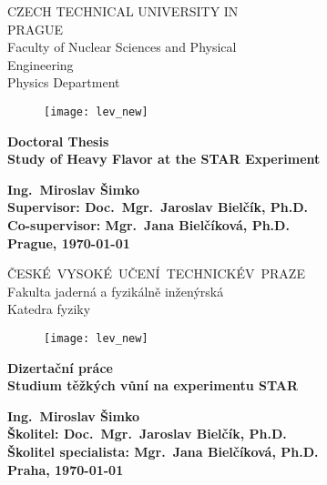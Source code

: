 \documentclass[a4paper,titlepage,11pt,twoside,openright]{report} %
\newcommand{\myself}{Ing.\ Miroslav Šimko}
\newcommand{\engtitle}{Study of Heavy Flavor at the STAR Experiment}
\newcommand{\czechtitle}{Studium těžkých vůní na experimentu STAR}
\newcommand{\skolitel}{Doc.\ Mgr.\ Jaroslav Bielčík, Ph.D.}
\newcommand{\konzultant}{Mgr.\ Jana Bielčíková, Ph.D.}
\begin{document}
\thispagestyle{empty}
\setcounter{page}{1}
\begin{center}
    {\LARGE \textsc CZECH TECHNICAL UNIVERSITY IN \\[0.3cm]PRAGUE}\\[2ex]
    {\LARGE \textsc Faculty of Nuclear Sciences and Physical \\[0.2cm]Engineering}\\[2ex]
    {\LARGE \textsc Physics Department}\\
    \vspace{1cm}
    \begin{figure}[ht!]
    \begin{center}
      {\texttt{[image: lev\_new]}}
    \end{center}
    \end{figure}
    \vspace{1cm}

    {\textbf {\Huge Doctoral Thesis \\[4ex]}
    {\LARGE \bf \engtitle} 
    }

    \vfill

    {\Large \bf \myself }\\ [4ex]
    {\large \bf  Supervisor: \skolitel}\\
    {\large \bf  Co-supervisor: \konzultant}\\[4ex]
    {\Large \bf Prague, \justyear\today}\\
    \newpage \rule{0pt}{2cm}
\end{center}
\thispagestyle{empty}
\begin{center}
    {\LARGE \textsc \mbox{\v{C}ESK\' E VYSOKÉ U\v CEN\' I TECHNICK\' E \\[0.3cm]V PRAZE}}\\[2ex]
    {\LARGE \textsc Fakulta jadern\' a a fyzik\' aln\v e in\v zen\' yrsk\' a}\\[2ex]
    {\LARGE \textsc Katedra fyziky}\\
    \vspace{1cm}
    \begin{figure}[ht!]
    \begin{center}
      {\texttt{[image: lev\_new]}}
    \end{center}
    \end{figure}
    \vspace{1cm}

    {\textbf {\Huge Dizertační práce \\[4ex]}
    {\LARGE \bf \czechtitle} 
    }

    \vfill

    {\Large \bf \myself }\\ [4ex]
    {\large \bf Školitel: \skolitel}\\
    {\large \bf Školitel specialista: \konzultant}\\[4ex]
    {\Large \bf Praha, \justyear\today}\\
    \newpage \rule{0pt}{2cm}
\end{center}
\end{document}
